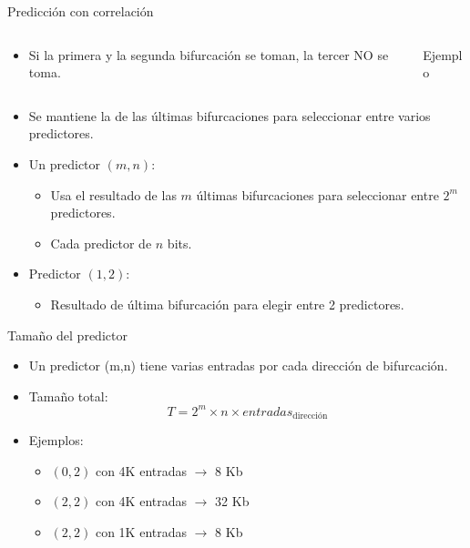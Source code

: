 \begin{frame}[t]{Predicción con correlación}

\begin{columns}

\begin{column}{.7\textwidth}
\begin{itemize}
  \item Si la primera y la segunda bifurcación se toman, la tercer NO se toma.
\end{itemize}
\end{column}

\begin{column}{.3\textwidth}
\begin{block}{Ejemplo}

\end{block}
\end{column}
\end{columns}

\begin{itemize}
  \item Se mantiene la  de las últimas bifurcaciones 
        para seleccionar entre varios predictores.
  \item Un predictor $(m,n)$:
    \begin{itemize}
      \item Usa el resultado de las $m$ últimas bifurcaciones para seleccionar 
            entre $2^m$ predictores.
      \item Cada predictor de $n$ bits.
    \end{itemize}
  \item Predictor $(1,2)$:
    \begin{itemize}
      \item Resultado de última bifurcación para elegir entre 2 predictores.
    \end{itemize}
\end{itemize}
\end{frame}

\begin{frame}[t]{Tamaño del predictor}
\begin{itemize}
  \item Un predictor (m,n) tiene varias entradas por cada dirección de
        bifurcación.

  \item Tamaño total:
\[
T = 2^m \times n \times entradas_{\text{dirección}}
\]

  \item Ejemplos:
    \begin{itemize}
      \item $(0,2)$ con 4K entradas $\rightarrow$ 8 Kb
      \item $(2,2)$ con 4K entradas $\rightarrow$ 32 Kb
      \item $(2,2)$ con 1K entradas $\rightarrow$ 8 Kb
   \end{itemize}
\end{itemize}
\end{frame}

